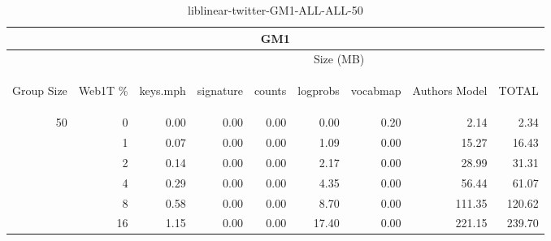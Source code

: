 \begin{center}
\begin{table}[htbp]
\begin{tabular}{ | r | r | r | r | r | r | r | r | r |}
\hline
\multicolumn{9}{|c|}{GM1}\\
\hline
 & & \multicolumn{7}{|c|}{Size (MB)}\\ \cline{3-9}
\begin{sideways}Group Size\end{sideways} & \begin{sideways}Web1T \% \end{sideways} & \begin{sideways}keys.mph\end{sideways} & \begin{sideways}signature\end{sideways} & \begin{sideways}counts\end{sideways} & \begin{sideways}logprobs\end{sideways} & \begin{sideways}vocabmap\end{sideways} & \begin{sideways}Authors Model \end{sideways} & \begin{sideways}TOTAL\end{sideways}\\
\hline
\multirow{5}{*}{50}
 & 0 & 0.00 & 0.00 & 0.00 & 0.00 & 0.20 & 2.14 & 2.34\\ \cline{2-9}
 & 1 & 0.07 & 0.00 & 0.00 & 1.09 & 0.00 & 15.27 & 16.43\\ \cline{2-9}
 & 2 & 0.14 & 0.00 & 0.00 & 2.17 & 0.00 & 28.99 & 31.31\\ \cline{2-9}
 & 4 & 0.29 & 0.00 & 0.00 & 4.35 & 0.00 & 56.44 & 61.07\\ \cline{2-9}
 & 8 & 0.58 & 0.00 & 0.00 & 8.70 & 0.00 & 111.35 & 120.62\\ \cline{2-9}
 & 16 & 1.15 & 0.00 & 0.00 & 17.40 & 0.00 & 221.15 & 239.70\\ \cline{2-9}
\hline
\end{tabular}
\caption{liblinear-twitter-GM1-ALL-ALL-50}
\label{table:liblinear-twitter-GM1-ALL-ALL-50}
\end{table}
\end{center}

